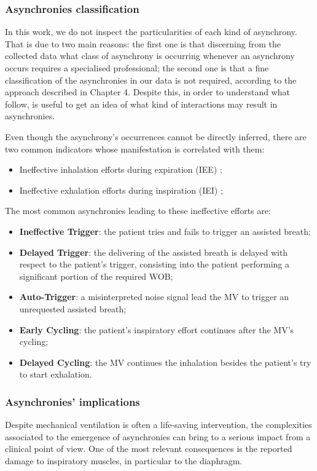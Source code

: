 \documentclass[a4paper, twoside]{article}
\begin{document}
    \subsubsection{Asynchronies classification}
    In this work, we do not inspect the particularities of each kind of asynchrony. That is due to two main reasons: the first one is that discerning from the collected data what class of asynchrony is occurring whenever an asynchrony occurs requires a specialised professional; the second one is that a fine classification of the asynchronies in our data is not required, according to the approach described in Chapter 4. Despite this, in order to understand what follow, is useful to get an idea of what kind of interactions may result in asynchronies.

    Even though the asynchrony's occurrences cannot be directly inferred, there are two common indicators whose manifestation is correlated with them:
    \begin{itemize}
        \item { Ineffective inhalation efforts during expiration (IEE) };
        \item { Ineffective exhalation efforts during inspiration (IEI) };
    \end{itemize}

    The most common asynchronies leading to these ineffective efforts are:
    \begin{itemize}
        \item \textbf{Ineffective Trigger}: the patient tries and fails to trigger an assisted breath;
        \item \textbf{Delayed Trigger}: the delivering of the assisted breath is delayed with respect to the patient's trigger, consisting into the patient performing a significant portion of the required WOB;
        \item \textbf{Auto-Trigger}: a misinterpreted noise signal lead the MV to trigger an unrequested assisted breath;
        \item \textbf{Early Cycling}: the patient's inspiratory effort continues after the MV's cycling;
        \item \textbf{Delayed Cycling}: the MV continues the inhalation besides the patient's try to start exhalation.
    \end{itemize}

    \subsubsection{Asynchronies' implications}
    Despite mechanical ventilation is often a life-saving intervention, the complexities associated to the emergence of asynchronies can bring to a serious impact from a clinical point of view. One of the most relevant consequences is the reported damage to inspiratory muscles, in particular to the diaphragm.
\end{document}
